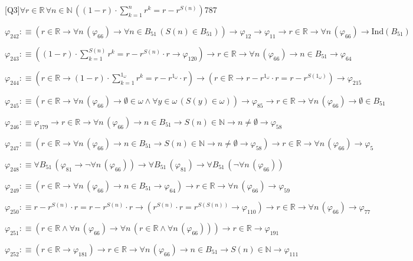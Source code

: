 \begin{fullproof}{[Q3]}{$\forall r \in \mathbb{R}\,\forall n \in \mathbb{N}\,((1 - r) \cdot {\textstyle\sum_{k=1}^{n} {{r}^{k}}} = r - {{r}^{S(n)}})$}{787}
\begin{abbrevlist}
\item $\varphi_{242} :\equiv (r \in \mathbb{R} \to \forall n\,(\varphi_{66}) \to \forall n \in B_{51}\,(S(n) \in B_{51})) \to \varphi_{12} \to \varphi_{11} \to r \in \mathbb{R} \to \forall n\,(\varphi_{66}) \to \mathrm{Ind}(B_{51})$
\item $\varphi_{243} :\equiv ((1 - r) \cdot {\textstyle\sum_{k=1}^{S(n)} {{r}^{k}}} = r - {{r}^{S(n)}} \cdot r \to \varphi_{120}) \to r \in \mathbb{R} \to \forall n\,(\varphi_{66}) \to n \in B_{51} \to \varphi_{64}$
\item $\varphi_{244} :\equiv (r \in \mathbb{R} \to (1 - r) \cdot {\textstyle\sum_{k=1}^{1_{\omega}} {{r}^{k}}} = r - {{r}^{1_{\omega}}} \cdot r) \to (r \in \mathbb{R} \to r - {{r}^{1_{\omega}}} \cdot r = r - {{r}^{S(1_{\omega})}}) \to \varphi_{215}$
\item $\varphi_{245} :\equiv (r \in \mathbb{R} \to \forall n\,(\varphi_{66}) \to \emptyset \in \omega \land \forall y \in \omega\,(S(y) \in \omega)) \to \varphi_{85} \to r \in \mathbb{R} \to \forall n\,(\varphi_{66}) \to \emptyset \in B_{51}$
\item $\varphi_{246} :\equiv \varphi_{179} \to r \in \mathbb{R} \to \forall n\,(\varphi_{66}) \to n \in B_{51} \to S(n) \in \mathbb{N} \to n \neq \emptyset \to \varphi_{58}$
\item $\varphi_{247} :\equiv (r \in \mathbb{R} \to \forall n\,(\varphi_{66}) \to n \in B_{51} \to S(n) \in \mathbb{N} \to n \neq \emptyset \to \varphi_{58}) \to r \in \mathbb{R} \to \forall n\,(\varphi_{66}) \to \varphi_{5}$
\item $\varphi_{248} :\equiv \forall B_{51}\,(\varphi_{81} \to \neg \forall n\,(\varphi_{66})) \to \forall B_{51}\,(\varphi_{81}) \to \forall B_{51}\,(\neg \forall n\,(\varphi_{66}))$
\item $\varphi_{249} :\equiv (r \in \mathbb{R} \to \forall n\,(\varphi_{66}) \to n \in B_{51} \to \varphi_{64}) \to r \in \mathbb{R} \to \forall n\,(\varphi_{66}) \to \varphi_{59}$
\item $\varphi_{250} :\equiv r - {{r}^{S(n)}} \cdot r = r - {{r}^{S(n)}} \cdot r \to ({{r}^{S(n)}} \cdot r = {{r}^{S(S(n))}} \to \varphi_{110}) \to r \in \mathbb{R} \to \forall n\,(\varphi_{66}) \to \varphi_{77}$
\item $\varphi_{251} :\equiv (r \in \mathbb{R} \land \forall n\,(\varphi_{66}) \to \forall n\,(r \in \mathbb{R} \land \forall n\,(\varphi_{66}))) \to r \in \mathbb{R} \to \varphi_{191}$
\item $\varphi_{252} :\equiv (r \in \mathbb{R} \to \varphi_{181}) \to r \in \mathbb{R} \to \forall n\,(\varphi_{66}) \to n \in B_{51} \to S(n) \in \mathbb{N} \to \varphi_{111}$

\end{abbrevlist}
\end{fullproof}
